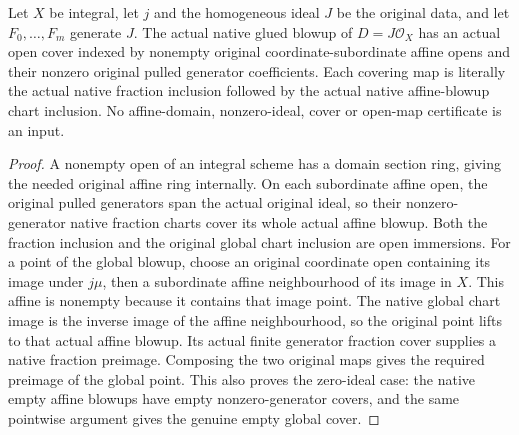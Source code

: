 \begin{definition}
\label{def:whole-original-global-fraction-open-cover}
\leanok
{}
Let $X$ be integral, let $j$ and the homogeneous ideal $J$ be the original data, and let $F_0,\ldots,F_m$ generate $J$. The actual native glued blowup of $D=J\mathcal O_X$ has an actual open cover indexed by nonempty original coordinate-subordinate affine opens and their nonzero original pulled generator coefficients. Each covering map is literally the actual native fraction inclusion followed by the actual native affine-blowup chart inclusion. No affine-domain, nonzero-ideal, cover or open-map certificate is an input.
\end{definition}
\begin{proof}
A nonempty open of an integral scheme has a domain section ring, giving the needed original affine ring internally. On each subordinate affine open, the original pulled generators span the actual original ideal, so their nonzero-generator native fraction charts cover its whole actual affine blowup. Both the fraction inclusion and the original global chart inclusion are open immersions. For a point of the global blowup, choose an original coordinate open containing its image under $j\mu$, then a subordinate affine neighbourhood of its image in $X$. This affine is nonempty because it contains that image point. The native global chart image is the inverse image of the affine neighbourhood, so the original point lifts to that actual affine blowup. Its actual finite generator fraction cover supplies a native fraction preimage. Composing the two original maps gives the required preimage of the global point. This also proves the zero-ideal case: the native empty affine blowups have empty nonzero-generator covers, and the same pointwise argument gives the genuine empty global cover.
\end{proof}
